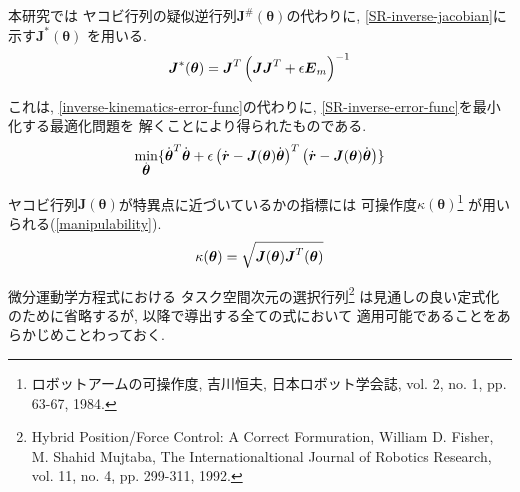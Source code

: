 本研究では
ヤコビ行列の疑似逆行列$\bm{J}^{\#}(\bm{\theta})$の代わりに,
\eqref{SR-inverse-jacobian}に示す$\bm{J}^{*}(\bm{\theta})$
を用いる.
\begin{eqnarray}
 \bm{J}^{*}(\bm{\theta})
  = \bm{J}^T\left(\bm{J}\bm{J}^T + \epsilon \bm{E}_m\right)^{-1}
 \eqlabel{SR-inverse-jacobian}
\end{eqnarray}

これは, \eqref{inverse-kinematics-error-func}の代わりに,
\eqref{SR-inverse-error-func}を最小化する最適化問題を
解くことにより得られたものである.
\begin{eqnarray}
 \min_{\dot{\bm{\theta}}}
\{
 \dot{\bm{\theta}}^T \dot{\bm{\theta}}
+
\epsilon
\left(\dot{\bm{r}} - \bm{J}(\bm{\theta})\dot{\bm{\theta}}\right)^T
\left(\dot{\bm{r}} - \bm{J}(\bm{\theta})\dot{\bm{\theta}}\right)
\}
 \eqlabel{SR-inverse-error-func}
\end{eqnarray}

ヤコビ行列$\bm{J}(\bm{\theta})$が特異点に近づいているかの指標には
可操作度$\kappa(\bm{\theta})$\footnote{
ロボットアームの可操作度, 吉川恒夫, 日本ロボット学会誌, vol. 2, no. 1,
pp. 63-67, 1984.
}
が用いられる(\eqref{manipulability}).
\begin{eqnarray}
 \kappa(\bm{\theta}) = \sqrt{\bm{J}(\bm{\theta}) \bm{J}^{T}(\bm{\theta})}
  \eqlabel{manipulability}
\end{eqnarray}


微分運動学方程式における
タスク空間次元の選択行列\footnote{
Hybrid Position/Force Control: A Correct Formuration,
William D. Fisher, M. Shahid Mujtaba,
The Internationaltional Journal of Robotics Research,
vol. 11, no. 4, pp. 299-311, 1992.
}
は見通しの良い定式化のために省略するが,
以降で導出する全ての式において
適用可能であることをあらかじめことわっておく.


